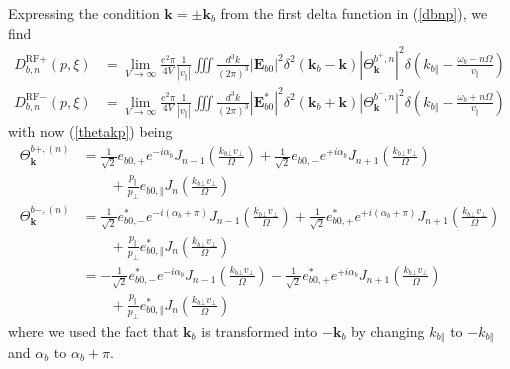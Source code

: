 Expressing the condition $\mathbf{k}=\pm\mathbf{k}_{b}$ from the first delta
function in (\ref{dbnp}), we find%
\begin{align}
D_{b,n}^{\text{RF}+}(p,\xi)  &  =\lim_{V\rightarrow\infty}\frac{e^{2}\pi}%
{4V}\frac{1}{\left|  v_{\Vert}\right|  }\iiint\frac{d^{3}k}{(2\pi)^{3}}\left|
\mathbf{E}_{b0}\right|  ^{2}\delta^{2}\left(  \mathbf{k}_{b}-\mathbf{k}%
\right)  \left|  \Theta_{\mathbf{k}}^{b^{+},n}\right|  ^{2}\delta\left(
k_{b\Vert}-\frac{\omega_{b}-n\Omega}{v_{\Vert}}\right) \label{dbnp2}\\
D_{b,n}^{\text{RF}-}(p,\xi)  &  =\lim_{V\rightarrow\infty}\frac{e^{2}\pi}%
{4V}\frac{1}{\left|  v_{\Vert}\right|  }\iiint\frac{d^{3}k}{(2\pi)^{3}}\left|
\mathbf{E}_{b0}^{\ast}\right|  ^{2}\delta^{2}\left(  \mathbf{k}_{b}%
+\mathbf{k}\right)  \left|  \Theta_{\mathbf{k}}^{b^{-},n}\right|  ^{2}%
\delta\left(  k_{b\Vert}-\frac{\omega_{b}+n\Omega}{v_{\Vert}}\right) \nonumber
\end{align}
with now (\ref{thetakp}) being%
\begin{align}
\Theta_{\mathbf{k}}^{b+,\left(  n\right)  }  &  =\frac{1}{\sqrt{2}}%
e_{b0,+}e^{-i\alpha_{b}}J_{n-1}\left(  \frac{k_{b\bot}v_{\bot}}{\Omega
}\right)  +\frac{1}{\sqrt{2}}e_{b0,-}e^{+i\alpha_{b}}J_{n+1}\left(
\frac{k_{b\bot}v_{\bot}}{\Omega}\right)  \nonumber\\&\qquad+\frac{p_{\Vert}}{p_{\bot}%
}e_{b0,\Vert}J_{n}\left(  \frac{k_{b\bot}v_{\bot}}{\Omega}\right)
\label{thetaknp}\\
\Theta_{\mathbf{k}}^{b-,\left(  n\right)  }  &  =\frac{1}{\sqrt{2}}%
e_{b0,-}^{\ast}e^{-i\left(  \alpha_{b}+\pi\right)  }J_{n-1}\left(
\frac{k_{b\bot}v_{\bot}}{\Omega}\right)  +\frac{1}{\sqrt{2}}e_{b0,+}^{\ast
}e^{+i\left(  \alpha_{b}+\pi\right)  }J_{n+1}\left(  \frac{k_{b\bot}v_{\bot}%
}{\Omega}\right) \nonumber\\&\qquad
+\frac{p_{\Vert}}{p_{\bot}}e_{b0,\Vert}^{\ast}J_{n}\left(
\frac{k_{b\bot}v_{\bot}}{\Omega}\right) \nonumber\\
&
=-\frac{1}{\sqrt{2}}e_{b0,-}^{\ast}e^{-i\alpha_{b}}J_{n-1}\left(
\frac{k_{b\bot}v_{\bot}}{\Omega}\right)
-\frac{1}{\sqrt{2}}e_{b0,+}^{\ast }e^{+i\alpha_{b}}J_{n+1}\left(
\frac{k_{b\bot}v_{\bot}}{\Omega}\right)
\nonumber\\&\qquad+\frac{p_{\Vert}}{p_{\bot}}e_{b0,\Vert}^{\ast}J_{n}\left(
\frac{k_{b\bot
}v_{\bot}}{\Omega}\right)  \label{thetaknm}%
\end{align}
where we used the fact that $\mathbf{k}_{b}$ is transformed into
$-\mathbf{k}_{b}$ by changing $k_{b\Vert}$ to $-k_{b\Vert}$ and $\alpha_{b}$
to $\alpha_{b}+\pi$.

